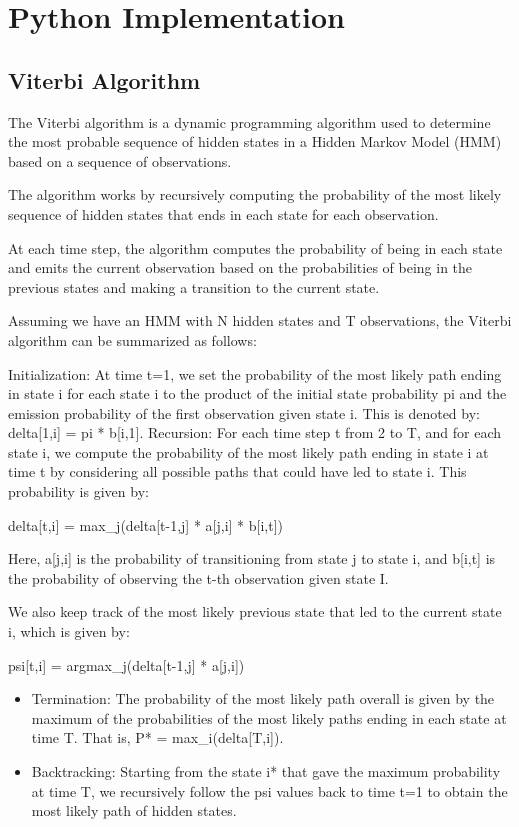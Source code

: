 \section{Python Implementation}
\label{sec:hmm_python}

\subsection{Viterbi Algorithm}
The Viterbi algorithm is a dynamic programming algorithm used to determine the most probable sequence of hidden states in a Hidden Markov Model (HMM) based on a sequence of observations. 

The algorithm works by recursively computing the probability of the most likely sequence of hidden states that ends in each state for each observation.

At each time step, the algorithm computes the probability of being in each state and emits the current observation based on the probabilities of being in the previous states and making a transition to the current state.

Assuming we have an HMM with N hidden states and T observations, the Viterbi algorithm can be summarized as follows:

    Initialization: At time t=1, we set the probability of the most likely path ending in state i for each state i to the product of the initial state probability pi and the emission probability of the first observation given state i. This is denoted by: delta[1,i] = pi * b[i,1].
    Recursion: For each time step t from 2 to T, and for each state i, we compute the probability of the most likely path ending in state i at time t by considering all possible paths that could have led to state i. This probability is given by:

delta[t,i] = max_j(delta[t-1,j] * a[j,i] * b[i,t])

Here, a[j,i] is the probability of transitioning from state j to state i, and b[i,t] is the probability of observing the t-th observation given state I.

We also keep track of the most likely previous state that led to the current state i, which is given by:

psi[t,i] = argmax_j(delta[t-1,j] * a[j,i])

\begin{itemize}
	\item Termination: The probability of the most likely path overall is given by the maximum of the probabilities of the most likely paths ending in each state at time T. That is, P* = max_i(delta[T,i]).
	\item Backtracking: Starting from the state i* that gave the maximum probability at time T, we recursively follow the psi values back to time t=1 to obtain the most likely path of hidden states.
\end{itemize}

